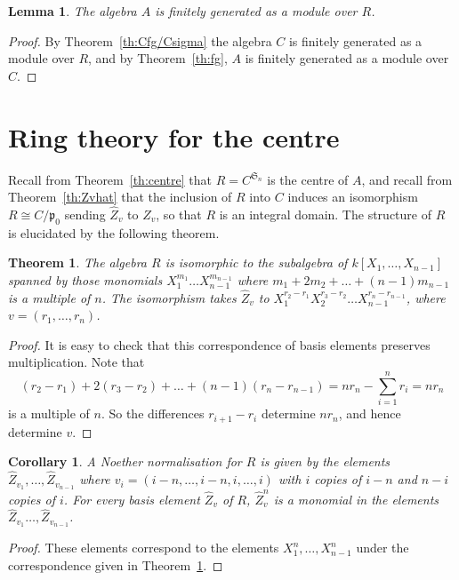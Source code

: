 \documentclass[12pt]{amsart}
\newcommand{\sym}[1]{\mathfrak{S}_{#1}}
\newcommand{\mfp}{\mathfrak{p}}
\numberwithin{equation}{section}
\newtheorem{theorem}[equation]{Theorem}
\newtheorem{lemma}[equation]{Lemma}
\newtheorem{corollary}[equation]{Corollary}
\theoremstyle{definition}
\begin{document}
\begin{lemma}
The algebra $A$ is finitely generated as a module over $R$.
\end{lemma}
\begin{proof}
By Theorem~\ref{th:Cfg/Csigma} the algebra $C$ is finitely generated
as a module over $R$, 
and by Theorem~\ref{th:fg}, $A$ is finitely generated as a module over $C$.
\end{proof}

\section{Ring theory for the centre}\label{se:R}

Recall from Theorem~\ref{th:centre} that $R=C^{\sym{n}}$ is the centre
of $A$, and recall from Theorem~\ref{th:Zvhat} that the inclusion of
$R$ into $C$ induces an isomorphism $R\cong C/\mfp_0$ sending $\hat
Z_v$ to $Z_v$, so that $R$ is an integral domain. The structure of $R$
is elucidated by the following theorem.

\begin{theorem}\label{th:R}
The algebra $R$ is isomorphic to the subalgebra of
$k[X_1,\dots,X_{n-1}]$ spanned by those monomials $X_1^{m_1}\dots
X_{n-1}^{m_{n-1}}$ where $m_1+2m_2+\dots+(n-1)m_{n-1}$ is a multiple
of $n$. The isomorphism takes $\hat Z_v$ to
$X_1^{r_2-r_1}X_2^{r_3-r_2}\dots X_{n-1}^{r_n-r_{n-1}}$, where $v=(r_1,\dots,r_n)$.
\end{theorem}
\begin{proof}
It is easy to check that this correspondence of basis elements
preserves multiplication. Note that 
\[ (r_2-r_1)+2(r_3-r_2)+\dots+(n-1)(r_n-r_{n-1})=nr_n-\sum_{i=1}^n r_i
  = nr_n \]
is a multiple of $n$. So the differences $r_{i+1}-r_i$ determine
$nr_n$, and hence determine $v$.
\end{proof}

\begin{corollary}\label{co:Noether-norm}
A Noether normalisation for $R$ is given by the elements $\hat
Z_{v_1},\dots,\hat Z_{v_{n-1}}$ where
$v_i=(i-n,\dots,i-n,i,\dots,i)$ with $i$ copies of $i-n$ and $n-i$
copies of $i$.
For every basis element $\hat Z_v$ of $R$, $\hat Z_v^n$ is a monomial
in the elements $\hat Z_{v_1}\dots,\hat Z_{v_{n-1}}$.
\end{corollary}
\begin{proof}
These elements correspond to the elements $X_1^n,\dots,X_{n-1}^n$
under the correspondence given in Theorem~\ref{th:R}.
\end{proof}
\end{document}
